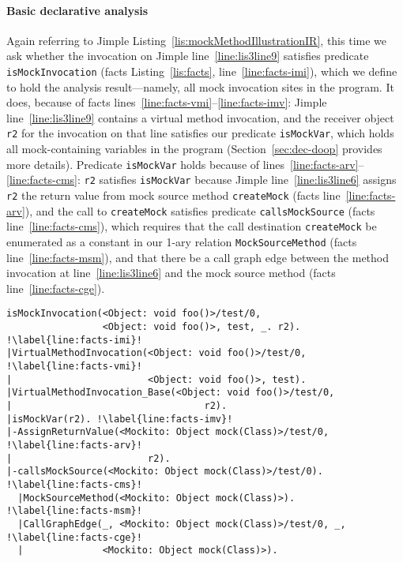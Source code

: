 \paragraph{Basic declarative analysis} Again referring to Jimple Listing~\ref{lis:mockMethodIllustrationIR}, this time we ask whether the invocation on Jimple line~\ref{line:lis3line9} satisfies predicate \texttt{isMockInvocation} (facts Listing~\ref{lis:facts}, line~\ref{line:facts-imi}), which we define to hold the analysis result---namely, all mock invocation sites in the program. It does, because of facts lines~\ref{line:facts-vmi}--\ref{line:facts-imv}: Jimple line~\ref{line:lis3line9} contains a virtual method invocation, and the receiver object \texttt{r2} for the invocation on that line satisfies our predicate \texttt{isMockVar}, which holds all mock-containing variables in the program (Section~\ref{sec:dec-doop} provides more details). Predicate \texttt{isMockVar} holds because of lines~\ref{line:facts-arv}--\ref{line:facts-cms}: \texttt{r2} satisfies \texttt{isMockVar} because Jimple line~\ref{line:lis3line6} assigns \texttt{r2} the return value from mock source method \texttt{createMock} (facts line~\ref{line:facts-arv}), and the call to \texttt{createMock} satisfies predicate \texttt{callsMockSource} (facts line~\ref{line:facts-cms}), which requires that the call destination \texttt{createMock} be enumerated as a constant in our 1-ary relation \texttt{MockSourceMethod} (facts line~\ref{line:facts-msm}), and that there be a call graph edge between the method invocation at line~\ref{line:lis3line6} and the mock source method (facts line~\ref{line:facts-cge}).


\begin{lstlisting}[basicstyle=\ttfamily, caption={Facts about invocation \texttt{r2.foo()} in method \texttt{test}.},
basicstyle=\scriptsize\ttfamily, framesep=4.5mm, framexleftmargin=1.0mm, captionpos=b, label=lis:facts, escapechar=!, morekeywords={@Test}]
isMockInvocation(<Object: void foo()>/test/0, 
                 <Object: void foo()>, test, _. r2). !\label{line:facts-imi}!
|VirtualMethodInvocation(<Object: void foo()>/test/0, !\label{line:facts-vmi}!
|                        <Object: void foo()>, test).
|VirtualMethodInvocation_Base(<Object: void foo()>/test/0, 
|                                  r2).
|isMockVar(r2). !\label{line:facts-imv}!
|-AssignReturnValue(<Mockito: Object mock(Class)>/test/0, !\label{line:facts-arv}!
|                        r2). 
|-callsMockSource(<Mockito: Object mock(Class)>/test/0). !\label{line:facts-cms}!
  |MockSourceMethod(<Mockito: Object mock(Class)>). !\label{line:facts-msm}!
  |CallGraphEdge(_, <Mockito: Object mock(Class)>/test/0, _, !\label{line:facts-cge}!
  |              <Mockito: Object mock(Class)>). 
\end{lstlisting}


